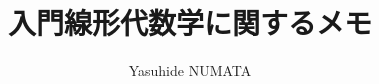\documentclass[tombow,dvipdfmx]{jsbook}
\theoremstyle{plain}
\theoremstyle{japanese}
\theoremstyle{remark}
\theoremstyle{japanese}
\theoremstyle{definition}
\theoremstyle{japanese}
\theoremstyle{definition}
\theoremstyle{numberedproof}
\theoremstyle{japanesenumberedproof}
\begin{document}
\title{入門線形代数学に関するメモ}

\author{Yasuhide NUMATA}

\maketitle




%

%


\appendix




{\printindex}
\end{document}
